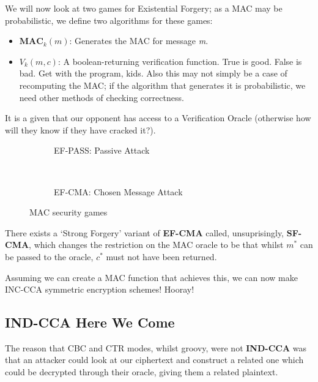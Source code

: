     We will now look at two games for Existential Forgery; as a MAC may be probabilistic, we define two algorithms for these games:

    \begin{itemize}
        \item $\textbf{MAC}_{k}(m)$: Generates the MAC for message \emph{m}.
        \item $V_{k}(m, c)$: A boolean-returning verification function. True is good. False is bad. Get with the program, kids. Also this may not simply be a case of recomputing the MAC; if the algorithm that generates it is probabilistic, we need other methods of checking correctness.
    \end{itemize}

    It is a given that our opponent has access to a Verification Oracle (otherwise how will they know if they have cracked it?). 

    \begin{figure}[htp!]
    \centering
    \begin{subfigure}[b]{0.4\textwidth}
        \centering
        \begin{cryptogame}{}
        \end{cryptogame}
        \caption{EF-PASS: Passive Attack}
        \label{fig:ef-pass}
    \end{subfigure}
    ~
    \begin{subfigure}[b]{0.4\textwidth}
        \centering
        \begin{cryptogame}{}
        \end{cryptogame}
        \caption{EF-CMA: Chosen Message Attack}
        \label{fig:ef-cma}
    \end{subfigure}
    \caption{MAC security games}
    \label{fig:ef-games}
\end{figure}

    There exists a `Strong Forgery' variant of \textbf{EF-CMA} called, unsuprisingly, \textbf{SF-CMA}, which changes the restriction on the MAC oracle to be that whilst $m^{*}$ can be passed to the oracle, $c^{*}$ must not have been returned.

    Assuming we can create a MAC function that achieves this, we can now make INC-CCA symmetric encryption schemes! Hooray!

    \subsection{IND-CCA Here We Come}
    The reason that CBC and CTR modes, whilst groovy, were not \textbf{IND-CCA} was that an attacker could look at our ciphertext and construct a related one which could be decrypted through their oracle, giving them a related plaintext.

